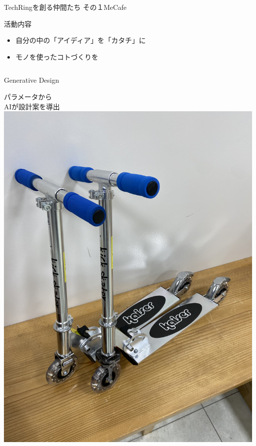 \documentclass[dvipdfmx]{beamer}
\begin{document}
\begin{frame}{TechRingを創る仲間たち その１}{MeCafe}

  \vspace{-2mm}
  
  \begin{minipage}{0.85\textwidth}
    \begin{block}{活動内容}
      \begin{itemize}
        \item 自分の中の「アイディア」を「カタチ」に
        \item モノを使ったコトづくりを
      \end{itemize}
    \end{block}
  \end{minipage}

  \begin{columns}[totalwidth=1.02\textwidth]
    \begin{column}{.3\textwidth}
      \begin{footnotesize}
        \begin{alertblock}{\normalsize Generative Design}
            \begin{center}
              パラメータから\\
              AIが設計案を導出\\
            \includegraphics[scale=.02,angle=-90]{pic/mecafe1.jpg}

\end{center}
\end{alertblock}
\end{footnotesize}
\end{column}
\end{columns}
\end{frame}
\end{document}
